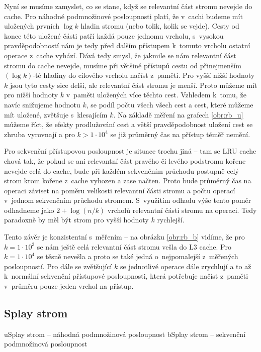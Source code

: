 Nyní se musíme zamyslet, co se stane, když se relevantní část stromu nevejde do
cache. Pro náhodné podmnožinové posloupnosti platí, že v~cachi budeme mít
uložených prvních $\log k$ hladin stromu (nebo tolik, kolik se vejde). Cesty od
konce této uložené části patří každá pouze jednomu vrcholu, s~vysokou
pravděpodobností nám je tedy před dalším přístupem k~tomuto vrcholu ostatní
operace z~cache vyhází. Dává tedy smysl, že jakmile se nám relevantní část
stromu do cache nevejde, musíme při většině přístupů cestu od přinejmenším
$(\log k)$-té hladiny do cílového vrcholu načíst z~paměti. Pro vyšší nižší
hodnoty $k$ jsou tyto cesty sice delší, ale relevantní část stromu je menší.
Proto můžeme mít pro nižší hodnoty $k$ v~paměti uložených více těchto cest.
Vzhledem k~tomu, že navíc snižujeme hodnotu $k$, se podíl počtu všech všech
cest a cest, které můžeme mít uložené, zvětšuje s~klesajícím $k$. Na základě
měření na grafech \ref{obr:rb_u} můžeme říct, že efekty prodlužování cest a
větší pravděpodobnost uložení cest se zhruba vyrovnají a pro $k > 1\cdot 10^4$
se již průměrný čas na přístup téměř nemění.

Pro sekvenční přístupovou posloupnost je situace trochu jiná -- tam se LRU
cache chová tak, že pokud se ani relevantní část pravého či levého podstromu
kořene nevejde celá do cache, bude při každém sekvenčním průchodu postupně celý
strom krom kořene z~cache vyhozen a zase načten. Proto bude průměrný čas na
operaci záviset na poměru velikosti relevantní části stromu a počtu operací
v~jednom sekvenčním průchodu stromem. S~využitím odhadu výše tento poměr
odhadneme jako $2 + \log(n/k)$ vrcholů relevantní části stromu na operaci. Tedy
paradoxně by měl být strom pro vyšší hodnoty $k$ rychlejší.

Tento závěr je konzistentní s~měřením -- na obrázku \ref{obr:rb_b} vidíme, že pro $k=1\cdot10^3$ se nám
ještě celá relevantní část stromu vešla do L3 cache. Pro $k=1\cdot 10^4$ se
těsně nevešla a proto se také jedná o~nejpomalejší z~měřených posloupností. Pro
dále se zvětšující $k$ se jednotlivé operace dále zrychlují a to až k~normální
sekvenční přístupové posloupnosti, která potřebuje načíst z~paměti v~průměru
pouze jeden vrchol na přístup. 

\subsection{Splay strom}

u{Splay strom -- náhodná podmnožinová posloupnost}
b{Splay strom -- sekvenční podmnožinová posloupnost}

